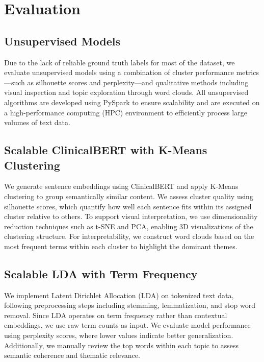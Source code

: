 \section{Evaluation}

\subsection*{Unsupervised Models}

Due to the lack of reliable ground truth labels for most of the dataset, we evaluate unsupervised models using a combination of cluster performance metrics—such as silhouette scores and perplexity—and qualitative methods including visual inspection and topic exploration through word clouds. All unsupervised algorithms are developed using PySpark to ensure scalability and are executed on a high-performance computing (HPC) environment to efficiently process large volumes of text data.\medskip

\subsection{Scalable ClinicalBERT with K-Means Clustering}

We generate sentence embeddings using ClinicalBERT and apply K-Means clustering to group semantically similar content. We assess cluster quality using silhouette scores, which quantify how well each sentence fits within its assigned cluster relative to others. To support visual interpretation, we use dimensionality reduction techniques such as t-SNE and PCA, enabling 3D visualizations of the clustering structure. For interpretability, we construct word clouds based on the most frequent terms within each cluster to highlight the dominant themes.\medskip

\subsection{Scalable LDA with Term Frequency}

We implement Latent Dirichlet Allocation (LDA) on tokenized text data, following preprocessing steps including stemming, lemmatization, and stop word removal. Since LDA operates on term frequency rather than contextual embeddings, we use raw term counts as input. We evaluate model performance using perplexity scores, where lower values indicate better generalization. Additionally, we manually review the top words within each topic to assess semantic coherence and thematic relevance.

